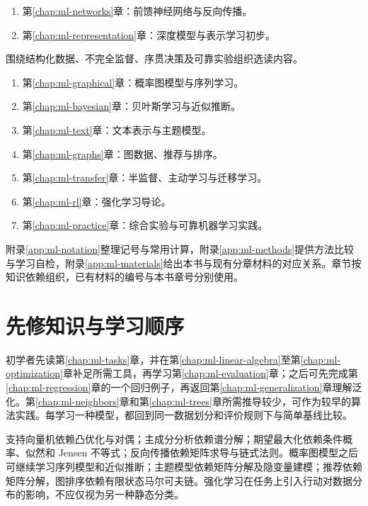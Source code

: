 \begin{description}
  \begin{enumerate}
    \item 第\ref{chap:ml-networks}章：前馈神经网络与反向传播。
    \item 第\ref{chap:ml-representation}章：深度模型与表示学习初步。
  \end{enumerate}
  \item[第五篇：进阶专题与综合实践]
  围绕结构化数据、不完全监督、序贯决策及可靠实验组织选读内容。
  \begin{enumerate}
    \item 第\ref{chap:ml-graphical}章：概率图模型与序列学习。
    \item 第\ref{chap:ml-bayesian}章：贝叶斯学习与近似推断。
    \item 第\ref{chap:ml-text}章：文本表示与主题模型。
    \item 第\ref{chap:ml-graphs}章：图数据、推荐与排序。
    \item 第\ref{chap:ml-transfer}章：半监督、主动学习与迁移学习。
    \item 第\ref{chap:ml-rl}章：强化学习导论。
    \item 第\ref{chap:ml-practice}章：综合实验与可靠机器学习实践。
  \end{enumerate}
\end{description}

附录\ref{app:ml-notation}整理记号与常用计算，附录\ref{app:ml-methods}提供方法比较与学习自检，附录\ref{app:ml-materials}给出本书与现有分章材料的对应关系。章节按知识依赖组织，已有材料的编号与本书章号分别使用。

\section*{先修知识与学习顺序}

初学者先读第\ref{chap:ml-tasks}章，并在第\ref{chap:ml-linear-algebra}至第\ref{chap:ml-optimization}章补足所需工具，再学习第\ref{chap:ml-evaluation}章；之后可先完成第\ref{chap:ml-regression}章的一个回归例子，再返回第\ref{chap:ml-generalization}章理解泛化。第\ref{chap:ml-neighbors}章和第\ref{chap:ml-trees}章所需推导较少，可作为较早的算法实践。每学习一种模型，都回到同一数据划分和评价规则下与简单基线比较。

支持向量机依赖凸优化与对偶；主成分分析依赖谱分解；期望最大化依赖条件概率、似然和 Jensen 不等式；反向传播依赖矩阵求导与链式法则。概率图模型之后可继续学习序列模型和近似推断；主题模型依赖矩阵分解及隐变量建模；推荐依赖矩阵分解，图排序依赖有限状态马尔可夫链。强化学习在任务上引入行动对数据分布的影响，不应仅视为另一种静态分类。

